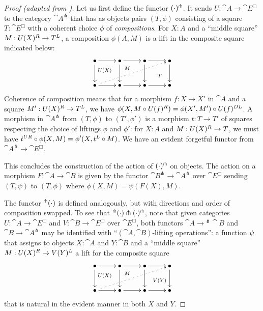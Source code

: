 \documentclass[reqno,10pt,a4paper,oneside]{amsart}
\begin{document}
\begin{proof}[Proof (adapted from \cite{garner:small-object-argument})]
Let us first define the functor $(\mathop{\cdot})^{\pitchfork}$.
It sends $U : \cat{A} \to \cat{E}^{\Box}$ to the category $\cat{A}^{\pitchfork}$ that has as objects pairs $(T, \phi)$ consisting of a square $T : \cat{E}^{\Box}$ with a coherent choice $\phi$ of \emph{compositions}.
For $X : A$ and a ``middle square'' $M : U(X){}^R \to T{}^L$, a composition $\phi(A, M)$ is a lift in the composite square indicated below:
\[
\xymatrix{
  \bullet
  \ar[r]
  \ar[d]
  \ar@{}[dr]|(0.4){U(X)}
&
  \bullet
  \ar[r]
  \ar[d]
  \ar@{}[dr]|(0.3){M}
&
  \bullet
  \ar[r]
  \ar[d]
  \ar@{}[dr]|(0.6){T}
&
  \bullet
  \ar[d]
\\
  \bullet
  \ar[r]
  \ar@{.>}[urrr]
&
  \bullet
  \ar[r]
&
  \bullet
  \ar[r]
&
  \bullet
}
\]
Coherence of composition means that for a morphism $f : X \to X'$ in $\cat{A}$ and a square $M' : U(X){}^R \to T{}^L$, we have $\phi(X, M \mathbin{\circ} U(f){}^R) = \phi(X', M') \mathbin{\circ} U(f){}^{DL}$.
A morphism in $\cat{A}^{\pitchfork}$ from $(T, \phi)$ to $(T', \phi')$ is a morphism $t : T \to T'$ of squares respecting the choice of liftings $\phi$ and $\phi'$: for $X : A$ and $M : U(X){}^R \to T$, we must have $t{}^{UR} \mathbin{\circ} \phi(X, M) = \phi'(X, t{}^L \mathbin{\circ} M)$.
We have an evident forgetful functor from $\cat{A}^{\pitchfork} \to \cat{E}^{\Box}$.

This concludes the construction of the action of $(\mathop{\cdot})^{\pitchfork}$ on objects.
The action on a morphism $F : \cat{A} \to \cat{B}$ is given by the functor $\cat{B}^{\pitchfork} \to \cat{A}^{\pitchfork}$ over $\cat{E}^{\Box}$ sending $(T, \psi)$ to $(T, \phi)$ where $\phi(X, M) = \psi(F(X), M)$.

The functor $^{\pitchfork}(\mathop{\cdot})$ is defined analogously, but with directions and order of composition swapped.
To see that $^\pitchfork(\mathop{\cdot}) \pitchfork (\mathop{\cdot})^{\pitchfork}$, note that given categories $U : \cat{A} \to \cat{E}^{\Box}$ and $V : \cat{B} \to \cat{E}^{\Box}$ over $\cat{E}^{\Box}$, both functors $\cat{A} \to {}^{\pitchfork}\cat{B}$ and $\cat{B} \to \cat{A}^{\pitchfork}$ may be identified with ``$(\cat{A}, \cat{B})$-lifting operations'': a function $\psi$ that assigns to objects $X : \cat{A}$ and $Y : \cat{B}$ and a ``middle square'' $M : U(X){}^R \to V(Y){}^L$ a lift for the composite square 
\[
\xymatrix{
  \bullet
  \ar[r]
  \ar[d]
  \ar@{}[dr]|(0.4){U(X)}
&
  \bullet
  \ar[r]
  \ar[d]
  \ar@{}[dr]|(0.3){M}
&
  \bullet
  \ar[r]
  \ar[d]
  \ar@{}[dr]|(0.6){V(Y)}
&
  \bullet
  \ar[d]
\\
  \bullet
  \ar[r]
  \ar@{.>}[urrr]
&
  \bullet
  \ar[r]
&
  \bullet
  \ar[r]
&
  \bullet
}
\]
that is natural in the evident manner in both $X$ and $Y$.
\end{proof}
\end{document}
